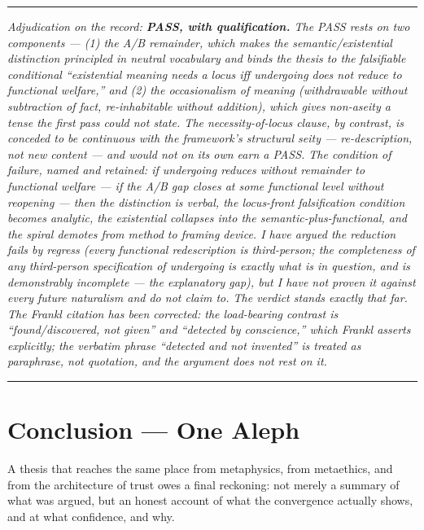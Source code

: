 \documentclass[11pt]{article}
\begin{document}
\medskip\noindent\rule{\linewidth}{0.3pt}\medskip

\emph{Adjudication on the record: \textbf{PASS, with qualification.} The PASS rests on two components — (1) the A/\allowbreak{}B remainder, which makes the semantic/\allowbreak{}existential distinction principled in neutral vocabulary and binds the thesis to the falsifiable conditional ``existential meaning needs a locus iff undergoing does not reduce to functional welfare,'' and (2) the occasionalism of meaning (withdrawable without subtraction of fact, re-inhabitable without addition), which gives non-aseity a tense the first pass could not state. The necessity-of-locus clause, by contrast, is conceded to be continuous with the framework's structural seity — re-description, not new content — and would not on its own earn a PASS. The condition of failure, named and retained: if undergoing reduces without remainder to functional welfare — if the A/\allowbreak{}B gap closes at some functional level without reopening — then the distinction is verbal, the locus-front falsification condition becomes analytic, the existential collapses into the semantic-plus-functional, and the spiral demotes from method to framing device. I have argued the reduction fails by regress (every functional redescription is third-person; the completeness of any third-person specification of undergoing is exactly what is in question, and is demonstrably incomplete — the explanatory gap), but I have not proven it against every future naturalism and do not claim to. The verdict stands exactly that far. The Frankl citation has been corrected: the load-bearing contrast is ``found/\allowbreak{}discovered, not given'' and ``detected by conscience,'' which Frankl asserts explicitly; the verbatim phrase ``detected and not invented'' is treated as paraphrase, not quotation, and the argument does not rest on it.}

\medskip\noindent\rule{\linewidth}{0.3pt}\medskip

\section*{Conclusion — One Aleph}

A thesis that reaches the same place from metaphysics, from metaethics, and from the architecture of trust owes a final reckoning: not merely a summary of what was argued, but an honest account of what the convergence actually shows, and at what confidence, and why.
\end{document}

